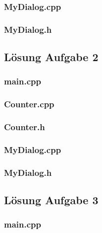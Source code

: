 \subsubsection{MyDialog.cpp}

\subsubsection{MyDialog.h}


\subsection{Lösung Aufgabe 2}
\subsubsection{main.cpp}

\subsubsection{Counter.cpp}

\subsubsection{Counter.h}

\subsubsection{MyDialog.cpp}

\subsubsection{MyDialog.h}


\subsection{Lösung Aufgabe 3}
\subsubsection{main.cpp}

